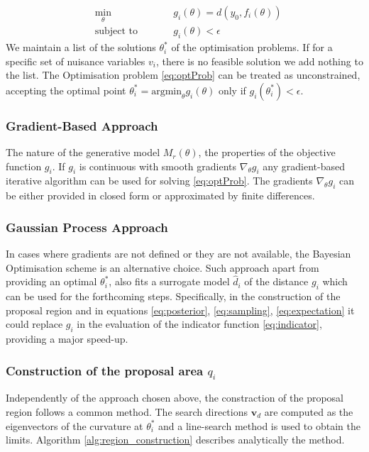 \documentclass[11pt,twoside]{article}
\numberwithin{Theorem}{section}
\numberwithin{Definition}{section}
\numberwithin{Lemma}{section}
\numberwithin{Algorithm}{section}
\numberwithin{equation}{section}
\begin{document}
\begin{subequations}
\begin{alignat}{2}
&\!\min_{\theta}        &\qquad& g_i(\theta) = d(y_0,  f_i(\theta))\label{eq:optProb}\\
&\text{subject to} &      & g_i(\theta) < \epsilon
\end{alignat}
\end{subequations}
%
We maintain a list of the solutions $\theta_i^*$ of the optimisation problems. If for a specific set of nuisance variables $v_i$, there is no feasible solution we add nothing to the list. The Optimisation problem \ref{eq:optProb} can be treated as unconstrained, accepting the optimal point $\theta_i^* = \text{argmin}_\theta g_i(\theta)$ only if $g_i(\theta_i^*) < \epsilon$.

\subsubsection{Gradient-Based Approach}

The nature of the generative model $M_r(\theta)$, the properties of the objective function $g_i$. If $g_i$ is continuous with smooth gradients $\nabla_{\theta} g_i$ any gradient-based iterative algorithm can be used for solving \ref{eq:optProb}. The gradients $\nabla_{\theta} g_i$ can be either provided in closed form or approximated by finite differences.

\subsubsection{Gaussian Process Approach}

In cases where gradients are not defined or they are not available, the Bayesian Optimisation scheme is an alternative choice. Such approach apart from providing an optimal $\theta_i^* $, also fits a surrogate model $\hat{d}_i$ of the distance $g_i$ which can be used for the forthcoming steps. Specifically, in the construction of the proposal region and in equations \ref{eq:posterior}, \ref{eq:sampling}, \ref{eq:expectation} it could replace $g_i$ in the evaluation of the indicator function \ref{eq:indicator}, providing a major speed-up.

\subsubsection{Construction of the proposal area $q_i$}

Independently of the approach chosen above, the constraction of the proposal region follows a common method. The search directions $\mathbf{v}_d$ are computed as the eigenvectors of the curvature at $\theta_i^*$ and a line-search method is used to obtain the limits. Algorithm \ref{alg:region_construction} describes analytically the method.
\end{document}
